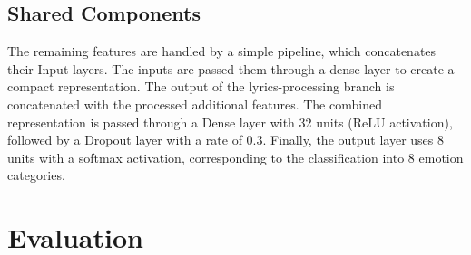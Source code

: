\subsection*{Shared Components}
The remaining features are handled by a simple pipeline, which concatenates
their Input layers.
The inputs are passed them through a dense layer to create a compact
representation.
The output of the lyrics-processing branch is concatenated with the processed
additional features.
The combined representation is passed through a Dense layer with 32 units
(ReLU activation), followed by a Dropout layer with a rate of 0.3.
Finally, the output layer uses 8 units with a softmax activation, corresponding
to the classification into 8 emotion categories.


\section*{Evaluation}
